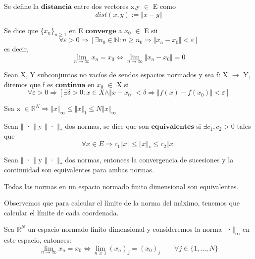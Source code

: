 \begin{ndef}[Distancia]
Se define la $\textbf{distancia}$ entre dos vectores x,y $\in$ E como
\[ dist(x,y) := \Vert x - y \Vert \]
\end{ndef}

\begin{ndef}
Se dice que $\lbrace x_n \rbrace _{n \geq 1}$ en E $\textbf{converge}$ a $x_0$ $\in$ E sii
\[ \forall \varepsilon > 0 \Rightarrow \left[ \exists n_0 \in \mathbb{N} : n \geq n_0 \Rightarrow \Vert x_n - x_0 \Vert < \varepsilon \right] \]
es decir,
\[ \lim_{n \rightarrow \infty} x_n = x_0  \Leftrightarrow \lim_{n \rightarrow \infty} \Vert x_n - x_0 \Vert = 0 \]
\end{ndef}

\begin{ndef}
Sean X, Y subconjuntos no vacíos de sendos espacios normados y sea f: X $\rightarrow$ Y, diremos que f es $\textbf{continua}$ en $x_{0}$ $\in$ X si
\[ \forall \varepsilon > 0 \Rightarrow \left[ \exists \delta > 0 : x \in X \wedge \Vert x - x_0 \Vert < \delta \Rightarrow \Vert f(x) - f(x_0) \Vert < \varepsilon \right] \]
\end{ndef}

\begin{nprop}
Sea x $\in \mathbb{R}^N \Rightarrow \Vert x \Vert _\infty \leq \Vert x \Vert _1 \leq N\Vert x \Vert _\infty $
\end{nprop}

\begin{ndef}
Sean $\Vert$ · $\Vert$ y $\Vert$ · $\Vert _*$ dos normas, se dice que son $\textbf{equivalentes}$ si $\exists c_1, c_2 > 0$ tales que
\[ \forall x \in E \Rightarrow c_1\Vert x \Vert \leq \Vert x \Vert _* \leq c_2\Vert x \Vert \]
\end{ndef}

\begin{nprop}
Sean $\Vert$ · $\Vert$ y $\Vert$ · $\Vert _*$ dos normas, entonces la convergencia de sucesiones y la continuidad son equivalentes para ambas normas.
\end{nprop}

\begin{nth}
Todas las normas en un espacio normado finito dimensional son equivalentes.
\end{nth}

Observemos que para calcular el límite de la norma del máximo, tenemos que calcular el límite de cada coordenada.

\begin{nprop}
Sea $\mathbb{R}^N$ un espacio normado finito dimensional y consideremos la norma $\Vert$·$\Vert _\infty$ en este espacio, entonces:
\[ \lim_{n \rightarrow \infty}x_n = x_0 \Leftrightarrow \lim_{n \geq 1}(x_n)_j = (x_0)_j \qquad \forall j\in \lbrace 1,...,N \rbrace \]
\end{nprop}

